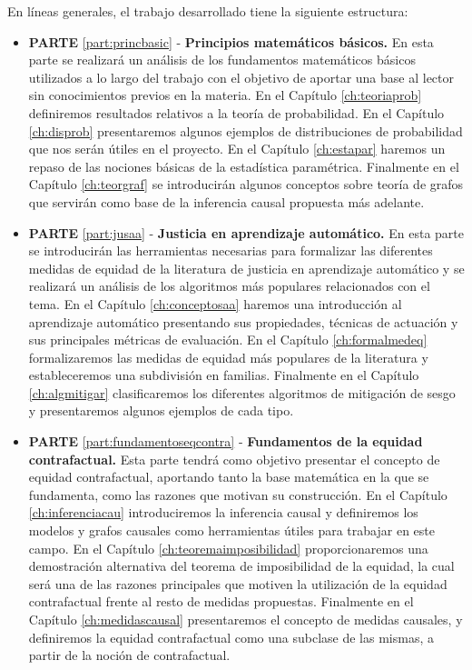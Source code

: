 \documentclass[oneside,openright,titlepage,numbers=noenddot,openany,headinclude,footinclude=true,
cleardoublepage=empty,abstractoff,BCOR=5mm,paper=a4,fontsize=12pt,main=spanish]{scrreprt}
\begin{document}
En líneas generales, el trabajo desarrollado tiene la siguiente estructura:

\begin{itemize}
    \item \textbf{PARTE} \ref{part:princbasic} - \textbf{Principios matemáticos básicos.} En esta parte se realizará un análisis de los fundamentos matemáticos básicos utilizados a lo largo del trabajo con el objetivo de aportar una base al lector sin conocimientos previos en la materia. En el Capítulo \ref{ch:teoriaprob} definiremos resultados relativos a la teoría de probabilidad. En el Capítulo \ref{ch:disprob} presentaremos algunos ejemplos de distribuciones de probabilidad que nos serán útiles en el proyecto. En el Capítulo \ref{ch:estapar} haremos un repaso de las nociones básicas de la estadística paramétrica. Finalmente en el Capítulo \ref{ch:teorgraf} se introducirán algunos conceptos sobre teoría de grafos que servirán como base de la inferencia causal propuesta más adelante.\\
    \item \textbf{PARTE} \ref{part:jusaa} - \textbf{Justicia en aprendizaje automático.} En esta parte se introducirán las herramientas necesarias para formalizar las diferentes medidas de equidad de la literatura de justicia en aprendizaje automático y se realizará un análisis de los algoritmos más populares relacionados con el tema. En el Capítulo \ref{ch:conceptosaa} haremos una introducción al aprendizaje automático presentando sus propiedades, técnicas de actuación y sus principales métricas de evaluación. En el Capítulo \ref{ch:formalmedeq} formalizaremos las medidas de equidad más populares de la literatura y estableceremos una subdivisión en familias. Finalmente en el Capítulo \ref{ch:algmitigar} clasificaremos los diferentes algoritmos de mitigación de sesgo y presentaremos algunos ejemplos de cada tipo.\\
    \item \textbf{PARTE} \ref{part:fundamentoseqcontra} - \textbf{Fundamentos de la equidad contrafactual.} Esta parte tendrá como objetivo presentar el concepto de equidad contrafactual, aportando tanto la base matemática en la que se fundamenta, como las razones que motivan su construcción. En el Capítulo \ref{ch:inferenciacau} introduciremos la inferencia causal y definiremos los modelos y grafos causales como herramientas útiles para trabajar en este campo. En el Capítulo \ref{ch:teoremaimposibilidad} proporcionaremos una demostración alternativa del teorema de imposibilidad de la equidad, la cual será una de las razones principales que motiven la utilización de la equidad contrafactual frente al resto de medidas propuestas. Finalmente en el Capítulo \ref{ch:medidascausal} presentaremos el concepto de medidas causales, y definiremos la equidad contrafactual como una subclase de las mismas, a partir de la noción de contrafactual.\\

\end{itemize}
\end{document}
